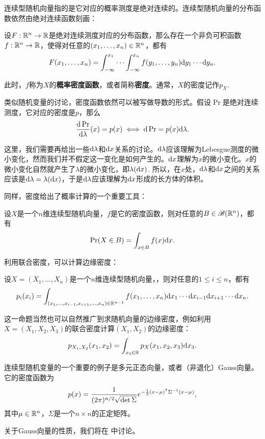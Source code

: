 连续型随机向量指的是它对应的概率测度是绝对连续的。连续型随机向量的分布函数依然由绝对连续函数刻画：

\begin{theorem}\label{thm:continuous-vector}
设$F:\mathbb{R}^n\to\mathbb{R}$是绝对连续测度对应的分布函数，那么存在一个非负可积函数$f:\mathbb{R}^n\to\mathbb{R}$，使得对任意的$(x_1,\dots,x_n)\in\mathbb{R}^n$，都有
\[F(x_1,\dots,x_n)=\int_{-\infty}^{x_1}\cdots\int_{-\infty}^{x_n}f(y_1,\dots,y_n)\mathrm{d} y_1\cdots\mathrm{d} y_n.\]
\end{theorem}

此时，$f$称为$X$的\textbf{概率密度函数}，或者简称\textbf{密度}。通常，$X$的密度记作$p_X$.

类似随机变量的讨论，密度函数依然可以被写做导数的形式。假设$\Pr$是绝对连续测度，它对应的密度是$p$，那么
\[\frac{\mathrm{d}\Pr}{\mathrm{d}\lambda}(x)=p(x)\iff \mathrm{d}\Pr=p(x)\mathrm{d}\lambda.\]

这里，我们需要再给出一些$\mathrm{d}\lambda$和$\mathrm{d} x$关系的讨论。$\mathrm{d}\lambda$应该理解为Lebesgue测度的微小变化，然而我们并不假定这一变化是如何产生的。$\mathrm{d} x$理解为$x$的微小变化。$x$的微小变化自然就产生了$\lambda$的微小变化，即$\lambda(\mathrm{d} x)$. 所以，在$x$处，$\mathrm{d}\lambda$和$\mathrm{d} x$之间的关系应该是$\mathrm{d}\lambda=\lambda(\mathrm{d} x)$，于是$\mathrm{d}\lambda$应该理解为$\mathrm{d} x$形成的长方体的体积。

同样，密度给出了概率计算的一个重要工具：
\begin{proposition}\label{prop:continuous-prob-vec}
    设$X$是一个$n$维连续型随机向量，$f$是它的密度函数，则对任意的$B\in\mathscr{B}(\mathbb{R}^n)$，都有
    \[\Pr(X\in B)=\int_{x\in B}f(x)\mathrm{d} x.\]
\end{proposition}

利用联合密度，可以计算边缘密度：
\begin{proposition}\label{prop:continuous-marginal}
    设$X=(X_1,\dots,X_n)$是一个$n$维连续型随机向量，，则对任意的$1\leq i\leq n$，都有
    \[p_i(x_i)=\int_{(x_1,\dots,x_{i-1},x_{i+1},\dots,x_n)\in\mathbb{R}^{n-1}}f(x_1,\dots,x_n)\mathrm{d} x_1\cdots\mathrm{d} x_{i-1}\mathrm{d} x_{i+1}\cdots\mathrm{d} x_n.\]
\end{proposition}
这一命题当然也可以自然推广到求随机向量的边缘密度，例如利用$X=(X_1,X_2,X_3)$的联合密度计算$(X_1,X_2)$的边缘密度：
\[
    p_{X_1,X_2}(x_1,x_2) = \int_{x_3\in\mathbb{R}}p_X(x_1,x_2,x_3)\mathrm{d} x_3.
\]

连续型随机变量的一个重要的例子是多元正态向量，或者（非退化）Gauss向量。它的密度函数为
\[p(x)=\frac{1}{(2\pi)^{n/2}\sqrt{\det\Sigma}}e^{-\frac{1}{2}(x-\mu)^{\mathsf{T}}\Sigma^{-1}(x-\mu)},\]
其中$\mu\in\mathbb{R}^n$，$\Sigma$是一个$n\times n$的正定矩阵。

关于Gauss向量的性质，我们将在 中讨论。

